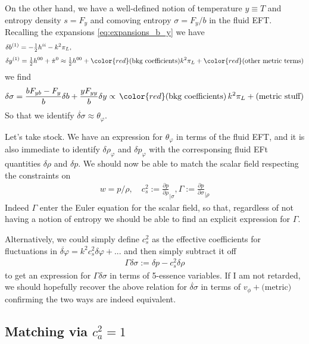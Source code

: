 On the other hand, we have a well-defined notion of temperature $y\equiv T$ and entropy density $s=F_y$ and comoving entropy $\sigma=F_y/b$ in the fluid EFT.
Recalling the expansions \eqref{eq:expansions_b_y} we have
{\small
\begin{align}\label{eq:expansions_b_y}
\begin{aligned}
    &\delta b^{(1)} = -\tfrac12 h^{ii}-k^2\pi_L,\\[3pt]
    &\delta y^{(1)} = \tfrac12 h^{00}+ \dot{\pi}^0 \approx \tfrac12 h^{00} +{\color{red}(\text{bkg coefficients)}} k^2 \pi_L +{\color{red}\text{(other metric terms)}}
\end{aligned}
\end{align}}
we find
\begin{align}\label{eq:identifying_entropy_vs_scala_field}
    \delta \sigma = \frac{bF_{yb}-F_y}{b} \delta b + \frac{yF_{yy}}{b}\delta y \propto \, {\color{red}(\text{bkg coefficients)}}\,k^2\pi_L+\text{(metric stuff)}
\end{align}
So that we identify $\dot{\delta\sigma}\approx \theta_\varphi$.

Let's take stock.
We have an expression for $\theta_\varphi$ in terms of the fluid EFT, and it is also immediate to identify $\delta\rho_\varphi$ and $\delta p_\varphi$ with the corresponsing fluid EFt quantities $\delta\rho$ and $\delta p$.
We should now be able to match the scalar field respecting the constraints on
\begin{align}
    w=p/\rho,\quad c_s^2:=\frac{\partial p}{\partial \rho}_{|\sigma}, \Gamma:=\frac{\partial p}{\partial \sigma}_{|\rho}
\end{align}
Indeed $\Gamma$ enter the Euler equation for the scalar field, so that, regardless of not having a notion of entropy we should be able to find an explicit expression for $\Gamma$.

Alternatively, we could simply define $c_s^2$ as the effective coefficients for fluctuations in $\ddot{\delta\varphi}=k^2c_s^2\delta\varphi+...$ and then simply subtract it off
\begin{align}
    \Gamma\delta\sigma:=\delta p-c_s^2\delta\rho
\end{align}
to get an expression for $\Gamma \delta\sigma$ in terms of 5-essence variables.
If I am not retarded, we should hopefully recover the above relation for $\dot{\delta\sigma}$ in terms of $v_\phi+\text{(metric)}$ confirming the two ways are indeed equivalent.


\subsection{Matching via $c_a^2=1$}

